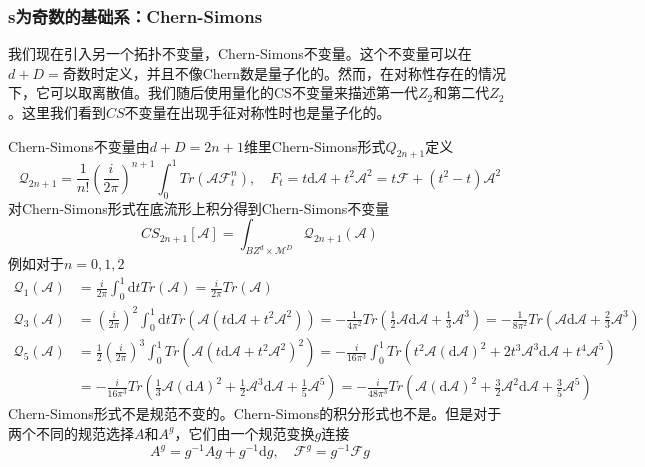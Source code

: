 \documentclass[a4paper]{article}
\numberwithin{equation}{subsection}
\begin{document}
\subsubsection{s为奇数的基础系：Chern-Simons}
我们现在引入另一个拓扑不变量，Chern-Simons不变量。这个不变量可以在$d+D=$奇数时定义，并且不像Chern数是量子化的。然而，在对称性存在的情况下，它可以取离散值。我们随后使用量化的CS不变量来描述第一代$Z_2$和第二代$Z_2$。这里我们看到$CS$不变量在出现手征对称性时也是量子化的。

Chern-Simons不变量由$d+D=2n+1$维里Chern-Simons形式$Q_{2n+1}$定义
\begin{equation}
    \mathcal{Q}_{2n+1}=\frac{1}{n!}\left(\frac{i}{2\pi}\right)^{n+1}\int_{0}^{1}Tr(\mathcal{AF}_{t}^n),\quad F_t=t\mathrm{d}\mathcal{A}+t^2\mathcal{A}^2=t\mathcal{F}+(t^2-t)\mathcal{A}^2
\end{equation}
对Chern-Simons形式在底流形上积分得到Chern-Simons不变量
\begin{equation}
    CS_{2n+1}[\mathcal{A}]=\int_{BZ^d\times\mathcal{M}^D}\mathcal{Q}_{2n+1}(\mathcal{A})
\end{equation}
例如对于$n=0,1,2$
\begin{equation}
    \begin{split}
        \mathcal{Q}_1(\mathcal{A})&=\frac{i}{2\pi}\int_0^1\mathrm{d}tTr(\mathcal{A})=\frac{i}{2\pi}Tr(\mathcal{A})\\
        \mathcal{Q}_3(\mathcal{A})&=\left(\frac{i}{2\pi}\right)^{2}\int_0^1\mathrm{d}tTr(\mathcal{A}(t\mathrm{d}\mathcal{A}+t^2\mathcal{A}^2))=-\frac{1}{4\pi^2}Tr(\frac{1}{2}\mathcal{A}\mathrm{d}\mathcal{A}+\frac{1}{3}\mathcal{A}^3)=-\frac{1}{8\pi^2}Tr(\mathcal{A}\mathrm{d}\mathcal{A}+\frac{2}{3}\mathcal{A}^3)\\
        \mathcal{Q}_5(\mathcal{A})&=\frac{1}{2}\left(\frac{i}{2\pi}\right)^3\int_0^1Tr(\mathcal{A}(t\mathrm{d}\mathcal{A}+t^2\mathcal{A}^2)^2)=-\frac{i}{16\pi^3}\int_0^1Tr(t^2\mathcal{A}(\mathrm{d}\mathcal{A})^2+2t^3\mathcal{A}^3\mathrm{d}\mathcal{A}+t^4\mathcal{A}^5)\\
        &=-\frac{i}{16\pi^3}Tr(\frac{1}{3}\mathcal{A}(\mathrm{d}A)^2+\frac{1}{2}\mathcal{A}^3\mathrm{d}\mathcal{A}+\frac{1}{5}\mathcal{A}^5)=-\frac{i}{48\pi^3}Tr(\mathcal{A}(\mathrm{d}\mathcal{A})^2+\frac{3}{2}\mathcal{A}^2\mathrm{d}\mathcal{A}+\frac{3}{5}\mathcal{A}^5)
    \end{split}
\end{equation}
Chern-Simons形式不是规范不变的。Chern-Simons的积分形式也不是。但是对于两个不同的规范选择$A$和$A^g$，它们由一个规范变换$g$连接
\begin{equation}
    A^g=g^{-1}Ag+g^{-1}\mathrm{d}g,\quad \mathcal{F}^g=g^{-1}\mathcal{F}g
\end{equation}
\end{document}
